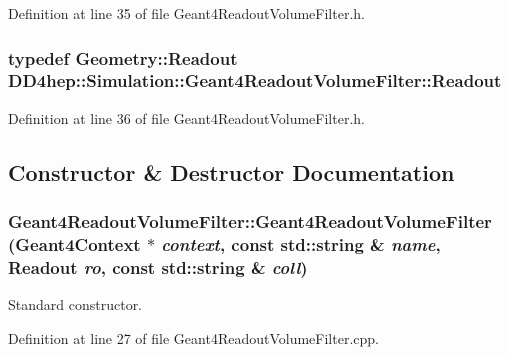 Definition at line 35 of file Geant4ReadoutVolumeFilter.h.\hypertarget{class_d_d4hep_1_1_simulation_1_1_geant4_readout_volume_filter_a30e6a3445a33de61e3c648149e285c46}{
\subsubsection[{Readout}]{\setlength{\rightskip}{0pt plus 5cm}typedef {\bf Geometry::Readout} {\bf DD4hep::Simulation::Geant4ReadoutVolumeFilter::Readout}}}
\label{class_d_d4hep_1_1_simulation_1_1_geant4_readout_volume_filter_a30e6a3445a33de61e3c648149e285c46}


Definition at line 36 of file Geant4ReadoutVolumeFilter.h.

\subsection{Constructor \& Destructor Documentation}
\hypertarget{class_d_d4hep_1_1_simulation_1_1_geant4_readout_volume_filter_a459197d17e4baedd3d1147e4def0aea9}{
\subsubsection[{Geant4ReadoutVolumeFilter}]{\setlength{\rightskip}{0pt plus 5cm}Geant4ReadoutVolumeFilter::Geant4ReadoutVolumeFilter ({\bf Geant4Context} $\ast$ {\em context}, \/  const std::string \& {\em name}, \/  {\bf Readout} {\em ro}, \/  const std::string \& {\em coll})}}
\label{class_d_d4hep_1_1_simulation_1_1_geant4_readout_volume_filter_a459197d17e4baedd3d1147e4def0aea9}


Standard constructor. 

Definition at line 27 of file Geant4ReadoutVolumeFilter.cpp.

